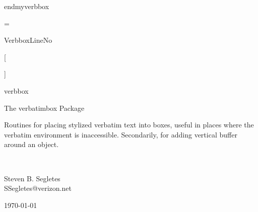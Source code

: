 \documentclass{article}
\def\vbx{\textsf{verbatimbox}}
\begin{document}
\begin{myverbbox}{\myvb}\begin{myverbbox}\end{myverbbox}
\begin{myverbbox}{\emyvb}end{myverbbox}\end{myverbbox}
\begin{myverbbox}{\vbfbox}\verbfilebox\end{myverbbox}
\begin{myverbbox}{\vbfnobox}\verbfilenobox\end{myverbbox}
\begin{myverbbox}{\tvb}\theverbbox\end{myverbbox}
\begin{myverbbox}{\avb}\addvbuffer\end{myverbbox}
\begin{myverbbox}{\bts}\boxtopsep\end{myverbbox}
\begin{myverbbox}{\bbs}\boxbottomsep\end{myverbbox}
\begin{myverbbox}{\eq} = \end{myverbbox}
\begin{myverbbox}{\vln}VerbboxLineNo\end{myverbbox}
\begin{myverbbox}{\lb}[\end{myverbbox}
\begin{myverbbox}{\rb}]\end{myverbbox}
\begin{myverbbox}{\lbr}{\end{myverbbox}
\begin{myverbbox}{\rbr}}\end{myverbbox}
\begin{myverbbox}[\footnotesize]{\fsvrbox}verbbox\end{myverbbox}
\begin{myverbbox}[\footnotesize]{\fbx}\fbox\end{myverbbox}
\begin{myverbbox}[\footnotesize]{\fbs}\fboxsep\end{myverbbox}

\begin{center}
\LARGE The {\vbx} Package\\
\rule{0em}{.7em}\small
{\centering
\begin{minipage}{.7\textwidth}%
Routines for placing stylized verbatim text into boxes, useful in 
places where the verbatim environment is inaccessible.  Secondarily, 
for adding vertical buffer around an object.
\end{minipage}
}\\
\rule{0em}{2.7em}\large Steven B. Segletes\\
SSegletes@verizon.net\\
\rule{0em}{1.7em}\today\\
\verbatimboxVersionNumber
\end{center}


\end{myverbbox}
\end{document}
